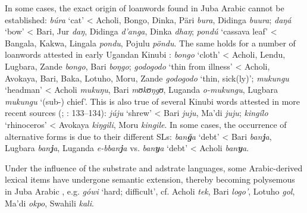 \documentclass[output=paper]{langsci/langscibook}
\begin{document}
In some cases, the exact origin of loanwords found in Juba Arabic cannot be established: \textit{búra} ‘cat’ < Acholi, Bongo, Dinka, Päri \textit{bura}, Didinga \textit{buura}; \textit{daŋá} ‘bow’ < Bari, Jur \textit{daŋ}, Didinga \textit{d'anga}, Dinka \textit{dhaŋ}; \textit{pondú} ‘cassava leaf’ < Bangala, Kakwa, Lingala \textit{pondu}, Pojulu \textit{pöndu}. The same holds for a number of loanwords attested in early Ugandan Kinubi \citep{Avram2017talk}: \textit{bongo} ‘cloth’ < Acholi, Lendu, Lugbara, Zande \textit{bongo}, Bari \textit{boŋgo}; \textit{godogodo} ‘thin from illness’ < Acholi, Avokaya, Bari, Baka, Lotuho, Moru, Zande \textit{godogodo} ‘thin, sick(ly)’; \textit{mukungu} ‘headman’ < Acholi \textit{mukuŋu}, Bari \textit{mʊkʊ}\textit{ŋgʊ}, Luganda \textit{o-mukungu}, Lugbara \textit{mukungu} ‘(sub-) chief’. This is also true of several Kinubi words attested in more recent sources (\citealt{Wellens2003}; \citealt{Nakao2012}: 133–134): \textit{júju} ‘shrew’ < Bari \textit{juju}, Ma'di \textit{juju}; \textit{kingílo} ‘rhinoceros’ < Avokaya \textit{kiŋgili}, Moru \textit{kingile}. In some cases, the occurrence of alternative forms is due to their different SLs: \textit{ban\textbf{ǧ}a} ‘debt’ < Bari \textit{ban\textbf{j}a}, Lugbara \textit{ban\textbf{j}a}, Luganda \textit{e-bban\textbf{j}a} vs. \textit{ban\textbf{y}a} ‘debt’ < Acholi \textit{ban\textbf{y}a}. 

Under the influence of the substrate and adstrate languages, some Arabic-derived lexical items have undergone semantic extension, thereby becoming polysemous in Juba Arabic \citep[136]{Nakao2012}, e.g. \textit{gówi} ‘hard; difficult’, cf. Acholi \textit{tek}, Bari \textit{logo’}, Lotuho \textit{gol}, Ma'di \textit{okpo}, Swahili \textit{kali}.
\end{document}
